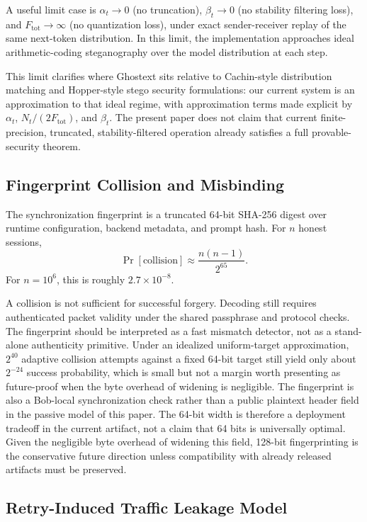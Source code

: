 A useful limit case is $\alpha_t\to0$ (no truncation), $\beta_t\to0$ (no stability filtering loss), and $F_{\mathrm{tot}}\to\infty$ (no quantization loss), under exact sender-receiver replay of the same next-token distribution. In this limit, the implementation approaches ideal arithmetic-coding steganography over the model distribution at each step.

This limit clarifies where Ghostext sits relative to Cachin-style distribution matching and Hopper-style stego security formulations: our current system is an approximation to that ideal regime, with approximation terms made explicit by $\alpha_t$, $N_t/(2F_{\mathrm{tot}})$, and $\beta_t$. The present paper does not claim that current finite-precision, truncated, stability-filtered operation already satisfies a full provable-security theorem.

\subsection{Fingerprint Collision and Misbinding}

The synchronization fingerprint is a truncated 64-bit SHA-256 digest over runtime configuration, backend metadata, and prompt hash. For $n$ honest sessions,
\begin{equation}
\Pr[\text{collision}]\approx\frac{n(n-1)}{2^{65}}.
\end{equation}
For $n=10^6$, this is roughly $2.7\times10^{-8}$.

A collision is not sufficient for successful forgery. Decoding still requires authenticated packet validity under the shared passphrase and protocol checks. The fingerprint should be interpreted as a fast mismatch detector, not as a stand-alone authenticity primitive.
Under an idealized uniform-target approximation, $2^{40}$ adaptive collision attempts against a fixed 64-bit target still yield only about $2^{-24}$ success probability, which is small but not a margin worth presenting as future-proof when the byte overhead of widening is negligible. The fingerprint is also a Bob-local synchronization check rather than a public plaintext header field in the passive model of this paper. The 64-bit width is therefore a deployment tradeoff in the current artifact, not a claim that 64 bits is universally optimal. Given the negligible byte overhead of widening this field, 128-bit fingerprinting is the conservative future direction unless compatibility with already released artifacts must be preserved.

\subsection{Retry-Induced Traffic Leakage Model}

